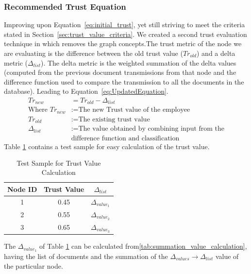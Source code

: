 \subsubsection{Recommended Trust Equation}
\label{sec:recommended_trust_equation}
Improving upon Equation~\ref{eq:initial_trust}, yet still striving to meet the
criteria stated in Section~\ref{sec:trust_value_criteria}. We created a second
trust evaluation technique in which removes the graph concepts.The trust metric
of the node we are evaluating is the difference between the old trust value
(\(Tr_{old}\)) and a delta metric (\(\Delta_{list}\)). The delta
metric is the weighted summation of the delta values (computed from the
previous document transmissions from that node and the difference function used to
compare the transmission to all the documents in the database).  Leading to
Equation~\ref{eq:UpdatedEquation}.
\begin{equation}
    \label{eq:UpdatedEquation}
    \begin{aligned}
        Tr_{new} &= Tr_{old} - \Delta_{list} \\
        \text{Where } Tr_{new} &:= \text{The new Trust value of the employee} \\
        Tr_{old} &:= \text{The existing trust value} \\
        \Delta_{list} &:= \text{The value obtained by combining input from the} \\
        &\text{difference function and classification}
    \end{aligned}
\end{equation}
Table \ref{tab:trust_value_calculation} contains a test sample for easy calculation of the trust value.

\begin{table}[h!]
    \centering
    \begin{tabular}{c | c | c}
        \hline 
        Node ID & Trust Value & \(\Delta_{list}\) \\
        \hline \hline
        1 & 0.45 & \(\Delta_{value_1}\) \\
        2 & 0.55 & \(\Delta_{value_2}\) \\
        3 & 0.65 & \(\Delta_{value_3}\) \\
    \end{tabular}
    \caption{Test Sample for Trust Value Calculation}
    \label{tab:trust_value_calculation}
\end{table}

The \(\Delta_{value_1}\) of Table
\ref{tab:trust_value_calculation} can be calculated
from\ref{tab:summation_value_calculation}, having the list of
documents and the summation of the \(\Delta_{values} \to \Delta_{list} \) value of the particular node. 


